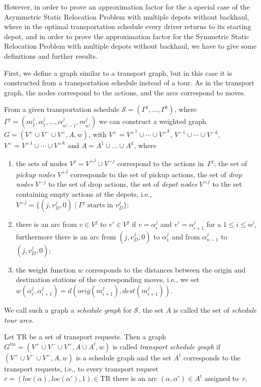 \documentclass[english]{llncs}
\numberwithin{sublemma}{lemma}
\newcommand{\aloc}{\ensuremath{loc}}
\newcommand{\orig}{\ensuremath{orig}}
\newcommand{\dest}{\ensuremath{dest}}
\newcommand{\ntourd}{\ensuremath{n}}
\newcommand{\tourd}{\ensuremath{\Gamma}}
\newcommand{\action}{\ensuremath{\alpha}}
\newcommand{\move}{\ensuremath{m}}
\newcommand{\sched}{\mathcal{S}}
\newcommand{\schedule}{\sched}
\newcommand{\TR}{\mathrm{TR}}
\newcommand{\Vpick}{{V^+}}
\newcommand{\Vdrop}{{V^-}}
\newcommand{\Vbal}{{V^=}}
\begin{document}
However, in order to prove an approximation factor for the a special case of the Asymmetric Static Relocation Problem with multiple depots without backhaul,
where in the optimal transportation schedule every driver returns to its starting depot,
and in order to prove the approximation factor for the Symmetric Static Relocation Problem with multiple depots without backhaul,
we have to give some definitions and further results.

First, we define a graph similar to a transport graph, but in this case it is constructed from a transportation schedule instead of a tour.
As in the transport graph, the nodes correspond to the actions, and the arcs correspond to moves.


\begin{definition}\label{def: static: reopt: multiple: transport graph}
From a given transportation schedule $\schedule = (\tourd^1, \dotsc, \tourd^k)$, 
where $\tourd^j = (\move_1^j, \action_1^j, \dotsc, \action_{\ntourd^j - 1}^j, \move_{\ntourd^j}^j)$
we can construct a weighted graph $G = (\Vpick \cup \Vdrop \cup \Vbal, A, w)$,
with $\Vpick = \Vpick^1 \cup \dotsm \cup \Vpick^k$, $\Vdrop^1 \cup \dotsm \cup \Vdrop^k$, $\Vbal = \Vbal^1 \cup \dotsm \cup \Vbal^k$ and $A = A^1 \cup \dots \cup A^k$,
where
\begin{enumerate}
 \item the sets of nodes $V^j = \Vpick^j \cup \Vdrop^j$ correspond to the actions in~$\tourd^j$; the set of \emph{pickup nodes} $\Vpick^j$ corresponds to the set of pickup actions,
        the set of \emph{drop nodes} $\Vdrop^j$ to the set of drop actions,
        the set of \emph{depot nodes} $\Vbal^j$ to the set containing empty actions at the depots, i.e., $\Vbal^j = \{ (j, v_D^j, 0) \mid \tourd^j \text{ starts in } v_D^j \}$;
 \item there is an arc from $v \in V^j$ to $v' \in V^j$ if $v = \action_i^j$ and $v' = \action_{i+1}^j$ for a $1 \leq i \leq \ntourd^j$, furthermore there is an arc from $(j, v_D^j, 0)$ to $\action_1^j$ and from $\action_{\ntourd - 1}^j$ to $(j, v_D^j, 0)$;
 \item the weight function $w$ corresponds to the distances between the origin and destination stations of the corresponding moves, i.e., we set $w(\action_i^j, \action_{i+1}^j) = d(\orig(\move_{i+1}^j), \dest(\move_{i+1}^j))$.
\end{enumerate}
We call such a graph a \emph{schedule graph} for $\schedule$, the set $A$ is called the set of \emph{schedule tour arcs}.

Let $\TR$ be a set of transport requests.
Then a graph $G^{tm} = (\Vpick \cup \Vdrop \cup \Vbal, A \cup A^t, w)$ is called \emph{transport schedule graph}
if $(\Vpick \cup \Vdrop \cup \Vbal, A, w)$ is a schedule graph and the set $A^t$ corresponds to the transport requests,
i.e., to every transport request $r = (\aloc(\action), \aloc(\action'), 1) \in \TR$ there is an arc $(\action, \action') \in A^t$ assigned to~$r$.
\end{definition}
\end{document}
